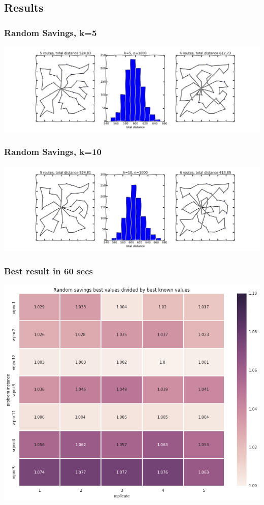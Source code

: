 \documentclass{beamer}
\begin{document}
\subsection{Results}
\begin{frame}
\frametitle{Random Savings, k=5}
\begin{center}
\includegraphics[scale=0.25]{figs/random_savings5}

\end{center}
\end{frame}


\begin{frame}
\frametitle{Random Savings, k=10}
\begin{center}
\includegraphics[scale=0.25]{figs/random_savings10}

\end{center}
\end{frame}


\begin{frame}
\frametitle{Best result in 60 secs}
\begin{center}
\includegraphics[scale=0.25]{figs/rs_best}

\end{center}
\end{frame}
\end{document}
